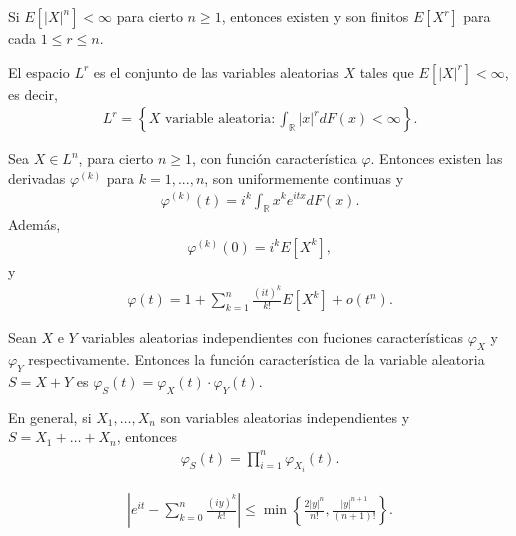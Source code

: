 \begin{prop}
    Si $E[|X|^n] < \infty$ para cierto $n \ge 1$, entonces existen y son finitos $E[X^r]$ para cada $1 \leq r \leq n$.
\end{prop}

\begin{defi}
    El espacio $L^r$ es el conjunto de las variables aleatorias $X$ tales que $E[|X|^r] < \infty$, es decir,
    \begin{align*}
        L^r = \left\{ X \text{ variable aleatoria} : \int_{\mathbb{R}} |x|^r dF(x) < \infty\right\}.
    \end{align*}
\end{defi}

\begin{teo}
    Sea $X \in L^n$, para cierto $n \ge 1$, con función característica $\varphi$. Entonces existen las derivadas $\varphi^{(k)}$ para $k = 1,...,n$, son uniformemente continuas y
    \begin{align*}
        \varphi^{(k)}(t) = i^k \int_{\mathbb{R}} x^k e^{itx} dF(x).
    \end{align*}
    Además,
    \begin{align*}
        \varphi^{(k)}(0) = i^k E[X^k],
    \end{align*}
    y
    \begin{align*}
        \varphi(t) = 1 + \sum_{k=1}^{n} \frac{(it)^k}{k!}E[X^k] + o(t^n).
    \end{align*}
\end{teo}

\begin{prop}
    Sean $X$ e $Y$ variables aleatorias independientes con fuciones características $\varphi_X$ y $\varphi_Y$ respectivamente. Entonces la función característica de la variable aleatoria $S = X + Y$ es $\varphi_S(t) = \varphi_X(t) \cdot \varphi_Y(t)$.
\end{prop}

\begin{obs}
    En general, si $X_1,\ldots,X_n$ son variables aleatorias independientes y $S = X_1 + \ldots + X_n$, entonces
    \begin{align*}
        \varphi_S(t) = \prod_{i=1}^{n} \varphi_{X_i}(t).
    \end{align*}
\end{obs}

\begin{lema}
    \begin{align*}
        \left| e^{it} - \sum_{k=0}^{n} \frac{(iy)^k}{k!} \right| \leq \min \left\{ \frac{2|y|^n}{n!}, \frac{|y|^{n+1}}{(n+1)!}\right\}.
    \end{align*}
\end{lema}

